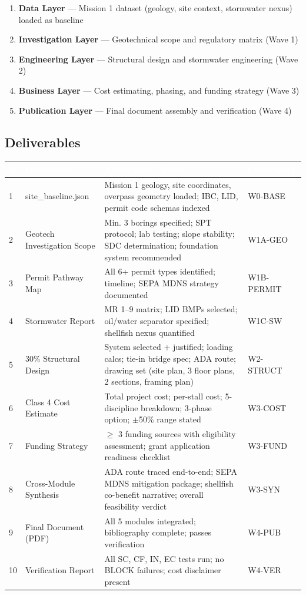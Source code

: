 \documentclass[11pt,letterpaper]{article}
\newcommand{\tableheader}[1]{\textbf{\sffamily\textcolor{white}{#1}}}
\begin{document}
\begin{enumerate}
  \item \textbf{Data Layer} --- Mission 1 dataset (geology, site context, stormwater nexus) loaded as baseline
  \item \textbf{Investigation Layer} --- Geotechnical scope and regulatory matrix (Wave 1)
  \item \textbf{Engineering Layer} --- Structural design and stormwater engineering (Wave 2)
  \item \textbf{Business Layer} --- Cost estimating, phasing, and funding strategy (Wave 3)
  \item \textbf{Publication Layer} --- Final document assembly and verification (Wave 4)
\end{enumerate}

\subsection{Deliverables}

\begin{center}
\begin{tabularx}{\textwidth}{C{0.5cm}L{3.5cm}L{4cm}L{2cm}}
\toprule
{}
\tableheader{\#} & \tableheader{Deliverable} & \tableheader{Acceptance Criteria} & \tableheader{Component} \\
 & site\_baseline.json & Mission 1 geology, site coordinates, overpass geometry loaded; IBC, LID, permit code schemas indexed & W0-BASE \\
2 & Geotech Investigation Scope & Min. 3 borings specified; SPT protocol; lab testing; slope stability; SDC determination; foundation system recommended & W1A-GEO \\
3 & Permit Pathway Map & All 6+ permit types identified; timeline; SEPA MDNS strategy documented & W1B-PERMIT \\
4 & Stormwater Report & MR 1--9 matrix; LID BMPs selected; oil/water separator specified; shellfish nexus quantified & W1C-SW \\
5 & 30\% Structural Design & System selected + justified; loading calcs; tie-in bridge spec; ADA route; drawing set (site plan, 3 floor plans, 2 sections, framing plan) & W2-STRUCT \\
6 & Class 4 Cost Estimate & Total project cost; per-stall cost; 5-discipline breakdown; 3-phase option; $\pm$50\% range stated & W3-COST \\
7 & Funding Strategy & $\geq$ 3 funding sources with eligibility assessment; grant application readiness checklist & W3-FUND \\
8 & Cross-Module Synthesis & ADA route traced end-to-end; SEPA MDNS mitigation package; shellfish co-benefit narrative; overall feasibility verdict & W3-SYN \\
9 & Final Document (PDF) & All 5 modules integrated; bibliography complete; passes verification & W4-PUB \\
10 & Verification Report & All SC, CF, IN, EC tests run; no BLOCK failures; cost disclaimer present & W4-VER \\
\bottomrule
\end{tabularx}
\end{center}
\end{document}

